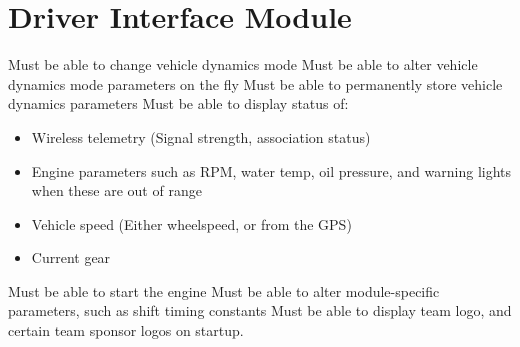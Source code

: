 \section{Driver Interface Module}
Must be able to change vehicle dynamics mode
Must be able to alter vehicle dynamics mode parameters on the fly
Must be able to permanently store vehicle dynamics parameters
Must be able to display status of:
\begin{itemize}
  \item Wireless telemetry (Signal strength, association status)
  \item Engine parameters such as RPM, water temp, oil pressure, and warning lights when these are out of range
  \item Vehicle speed (Either wheelspeed, or from the GPS)
  \item Current gear
\end{itemize}
Must be able to start the engine
Must be able to alter module-specific parameters, such as shift timing constants
Must be able to display team logo, and certain team sponsor logos on startup.